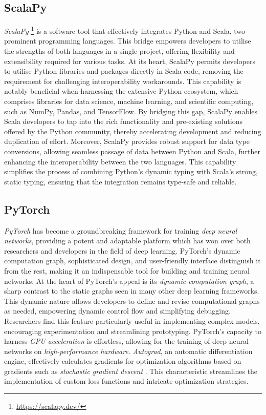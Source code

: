 \documentclass[12pt,a4paper,openright,twoside]{book}
\begin{document}
\subsection*{ScalaPy}
\emph{ScalaPy} \footnote{\url{https://scalapy.dev/}} is a software tool that effectively integrates Python and Scala, 
    two prominent programming languages. This bridge empowers developers to utilise the strengths of both languages 
    in a single project, offering flexibility and extensibility required for various tasks.
    At its heart, ScalaPy permits developers to utilise Python libraries and packages directly in Scala code, 
    removing the requirement for challenging interoperability workarounds. This capability is notably beneficial 
    when harnessing the extensive Python ecosystem, which comprises libraries for data science, machine learning, 
    and scientific computing, such as NumPy, Pandas, and TensorFlow. By bridging this gap, ScalaPy enables Scala developers
    to tap into the rich functionality and pre-existing solutions offered by the Python community, thereby accelerating 
    development and reducing duplication of effort.
    Moreover, ScalaPy provides robust support for data type conversions, allowing seamless passage of data between 
    Python and Scala, further enhancing the interoperability between the two languages. This capability simplifies 
    the process of combining Python's dynamic typing with Scala's strong, static typing, ensuring that the integration 
    remains type-safe and reliable.

\subsection*{PyTorch}

\emph{PyTorch} \cite{imambi2021pytorch} has become a groundbreaking framework for training \emph{deep neural networks}, providing a 
    potent and adaptable platform which has won over both researchers and developers in the field of deep learning. 
    PyTorch's dynamic computation graph, sophisticated design, and user-friendly interface distinguish it from the rest, 
    making it an indispensable tool for building and training neural networks.
    At the heart of PyTorch's appeal is its \emph{dynamic computation graph}, a sharp contrast to the static graphs seen in many 
    other deep learning frameworks. This dynamic nature allows developers to define and revise computational graphs as
    needed, empowering dynamic control flow and simplifying debugging. Researchers find this feature particularly useful 
    in implementing complex models, encouraging experimentation and streamlining prototyping.
    PyTorch's capacity to harness \emph{GPU acceleration} is effortless, allowing for the training of deep neural networks on 
    \emph{high-performance hardware}. \emph{Autograd}, an automatic differentiation engine, effectively calculates 
    gradients for optimization algorithms based on gradients such as \emph{stochastic gradient descent} \cite{amari1993backpropagation}. 
    This characteristic streamlines the implementation of custom loss functions and intricate optimization strategies.
\end{document}
